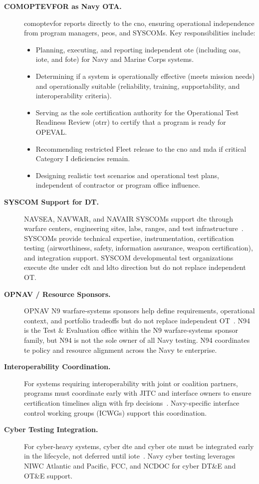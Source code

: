 \documentclass[../main.tex]{subfiles}
\begin{document}
\begin{description}
  \item[\textbf{COMOPTEVFOR as Navy OTA.}] \ac{comoptevfor} reports directly to the \ac{cno}, ensuring operational independence from program managers, \acp{peo}, and SYSCOMs. Key responsibilities include:
    \begin{itemize}
      \item Planning, executing, and reporting independent \ac{ote} (including \acp{oa}, \ac{iote}, and \ac{fote}) for Navy and Marine Corps systems.
      \item Determining if a system is operationally effective (meets mission needs) and operationally suitable (reliability, training, supportability, and interoperability criteria).
      \item Serving as the sole certification authority for the Operational Test Readiness Review (\ac{otrr}) to certify that a program is ready for OPEVAL.
      \item Recommending restricted Fleet release to the \ac{cno} and \ac{mda} if critical Category I deficiencies remain.
      \item Designing realistic test scenarios and operational test plans, independent of contractor or program office influence.
    \end{itemize}
  \item[\textbf{SYSCOM Support for DT.}] NAVSEA, NAVWAR, and NAVAIR SYSCOMs support \ac{dte} through warfare centers, engineering sites, labs, ranges, and test infrastructure~\autocite{edo-3-5-5-test-eval-part-i-2025}. SYSCOMs provide technical expertise, instrumentation, certification testing (airworthiness, safety, information assurance, weapon certification), and integration support. SYSCOM developmental test organizations execute \ac{dte} under \ac{cdt} and \ac{ldto} direction but do not replace independent OT.
  \item[\textbf{OPNAV / Resource Sponsors.}] OPNAV N9 warfare-systems sponsors help define requirements, operational context, and portfolio tradeoffs but do not replace independent OT~\autocite{edo-3-5-6-test-eval-part-ii-2025}. N94 is the Test \& Evaluation office within the N9 warfare-systems sponsor family, but N94 is not the sole owner of all Navy testing. N94 coordinates \ac{te} policy and resource alignment across the Navy \ac{te} enterprise.
  \item[\textbf{Interoperability Coordination.}] For systems requiring interoperability with joint or coalition partners, programs must coordinate early with JITC and interface owners to ensure certification timelines align with \ac{frp} decisions~\autocite{JITC-interoperability}. Navy-specific interface control working groups (ICWGs) support this coordination.
  \item[\textbf{Cyber Testing Integration.}] For cyber-heavy systems, cyber \ac{dte} and cyber \ac{ote} must be integrated early in the lifecycle, not deferred until \ac{iote}~\autocite{DoDM5000-103,DoDI5000-90}. Navy cyber testing leverages NIWC Atlantic and Pacific, FCC, and NCDOC for cyber DT\&E and OT\&E support.
\end{description}
\end{document}
